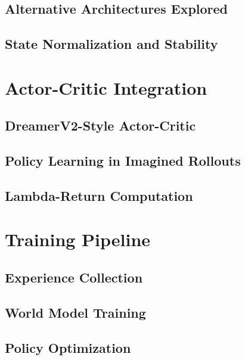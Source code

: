 \documentclass[
	english,
	ruledheaders=section,
	class=report,
	thesis={type=master},
	accentcolor=9c,
	custommargins=true,
	marginpar=false,
	parskip=half-,
	fontsize=11pt,
]{tudapub}
\begin{document}
\subsection{Alternative Architectures Explored}
\label{subsec:alternative_architectures}

\subsection{State Normalization and Stability}
\label{subsec:normalization}

\section{Actor-Critic Integration}
\label{sec:actor_critic}

\subsection{DreamerV2-Style Actor-Critic}
\label{subsec:dreamer_ac}

\subsection{Policy Learning in Imagined Rollouts}
\label{subsec:imagined_rollouts}

\subsection{Lambda-Return Computation}
\label{subsec:lambda_returns}

\section{Training Pipeline}
\label{sec:training_pipeline}

\subsection{Experience Collection}
\label{subsec:experience_collection}

\subsection{World Model Training}
\label{subsec:world_model_training}

\subsection{Policy Optimization}
\label{subsec:policy_optimization}
\end{document}
